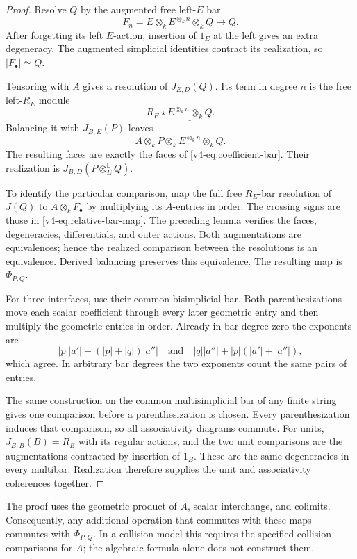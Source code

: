 \begin{proof}
Resolve \(Q\) by the augmented free left-\(E\) bar
\[
 F_n=E\otimes_kE^{\otimes_kn}\otimes_kQ
       \longrightarrow Q.
\]
After forgetting its left \(E\)-action, insertion of \(1_E\)
at the left gives an extra degeneracy. The augmented
simplicial identities contract its realization, so
\(|F_\bullet|\simeq Q\).

Tensoring with \(A\) gives a resolution of \(J_{E,D}(Q)\).
Its term in degree \(n\) is the free left-\(R_E\) module
\[
 R_E\star\underline{E^{\otimes_kn}\otimes_kQ}.
\]
Balancing it with \(J_{B,E}(P)\) leaves
\[
 A\otimes_kP\otimes_kE^{\otimes_kn}\otimes_kQ.
\]
The resulting faces are exactly the faces of
\eqref{v4-eq:coefficient-bar}. Their realization is
\(J_{B,D}(P\otimes_E^{\mathbb L}Q)\).

To identify the particular comparison, map the full free
\(R_E\)-bar resolution of \(J(Q)\) to \(A\otimes_kF_\bullet\)
by multiplying its \(A\)-entries in order.
The crossing signs are those in
\eqref{v4-eq:relative-bar-map}. The preceding lemma verifies
the faces, degeneracies, differentials, and outer actions.
Both augmentations are equivalences; hence the realized
comparison between the resolutions is an equivalence.
Derived balancing preserves this equivalence. The resulting
map is \(\Phi_{P,Q}\).

For three interfaces, use their common bisimplicial bar.
Both parenthesizations move each scalar coefficient through
every later geometric entry and then multiply the geometric
entries in order. Already in bar degree zero the exponents
are
\[
 |p||a'|+(|p|+|q|)|a''|
 \quad\text{and}\quad
 |q||a''|+|p|(|a'|+|a''|),
\]
which agree. In arbitrary bar degrees the two exponents count
the same pairs of entries.

The same construction on the common multisimplicial bar of
any finite string gives one comparison before a
parenthesization is chosen. Every parenthesization induces
that comparison, so all associativity diagrams commute.
For units, \(J_{B,B}(B)=R_B\) with its regular actions, and
the two unit comparisons are the augmentations contracted
by insertion of \(1_B\). These are the same degeneracies
in every multibar. Realization therefore supplies the unit
and associativity coherences together.
\end{proof}

The proof uses the geometric product of \(A\), scalar
interchange, and colimits. Consequently, any additional
operation that commutes with these maps commutes with
\(\Phi_{P,Q}\). In a collision model this requires the
specified collision comparisons for \(A\); the algebraic
formula alone does not construct them.


